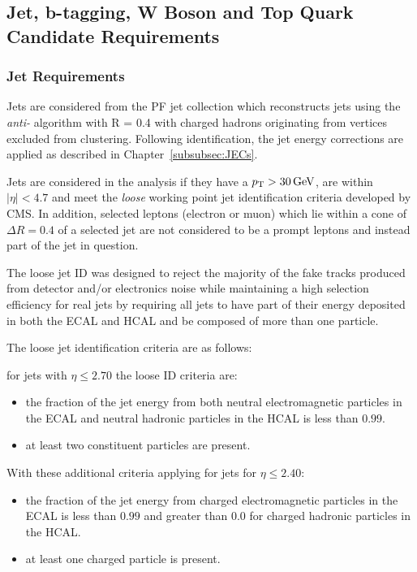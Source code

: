 \subsection{Jet, b-tagging, W Boson and Top Quark Candidate Requirements}
\subsubsection{Jet Requirements}
Jets are considered from the PF jet collection which reconstructs jets using the \emph{anti-\kt} algorithm with R = 0.4 with charged hadrons originating from \PU vertices excluded from clustering.
Following identification, the jet energy corrections are applied as described in Chapter~\ref{subsubsec:JECs}.

Jets are considered in the analysis if they have a $p_{\mathrm{T}} > 30\,\text{Ge\hspace{-.08em}V}$, are within $|\eta| < 4.7$ and meet the \emph{loose} working point jet identification criteria developed by CMS.
In addition, selected leptons (electron or muon) which lie within a cone of $\Delta R = 0.4$ of a selected jet are not considered to be a prompt leptons and instead part of the jet in question.

The loose jet ID was designed to reject the majority of the fake tracks produced from detector and/or electronics noise while maintaining a high selection efficiency for real jets by requiring all jets to have part of their energy deposited in both the ECAL and HCAL and be composed of more than one particle.

The loose jet identification criteria are as follows:

for jets with $\eta \leq 2.70$ the loose ID criteria are:
\begin{itemize}
\item the fraction of the jet energy from both neutral electromagnetic particles in the ECAL and neutral hadronic particles in the HCAL is less than $0.99$.
\item at least two constituent particles are present.
\end{itemize}

With these additional criteria applying for jets for $\eta \leq 2.40$:
\begin{itemize}
\item the fraction of the jet energy from charged electromagnetic particles in the ECAL is less than $0.99$ and greater than 0.0 for charged hadronic particles in the HCAL.
\item at least one charged particle is present.
\end{itemize}

